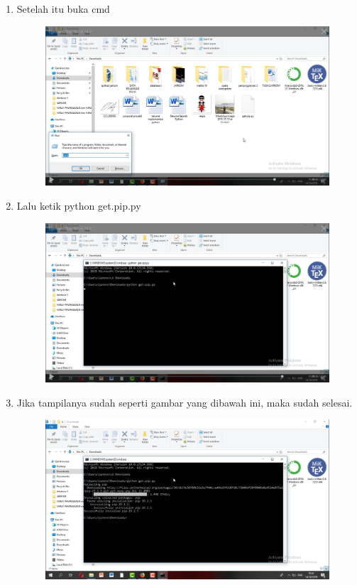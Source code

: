 \begin{enumerate}
\begin{enumerate}
\begin{figure}[h]
    \caption{}
    \label{fig:my_label}
\end{figure}
\item  Setelah itu buka cmd
\begin{figure}[h]
    \centering
    \includegraphics[scale=0.2]{gambar/14.png}
    \caption{}
    \label{fig:my_label}
\end{figure}
\item  Lalu ketik  python get.pip.py
\begin{figure}[h]
    \centering
    \includegraphics[scale=0.2]{gambar/15.png}
    \caption{}
    \label{fig:my_label}
\end{figure}
\item Jika tampilanya sudah seperti gambar yang dibawah ini, maka sudah selesai.
\begin{figure}[h]
    \centering
    \includegraphics[scale=0.2]{gambar/16.png}
    \caption{}
    \label{fig:my_label}
\end{figure}

\end{enumerate}
\end{enumerate}
